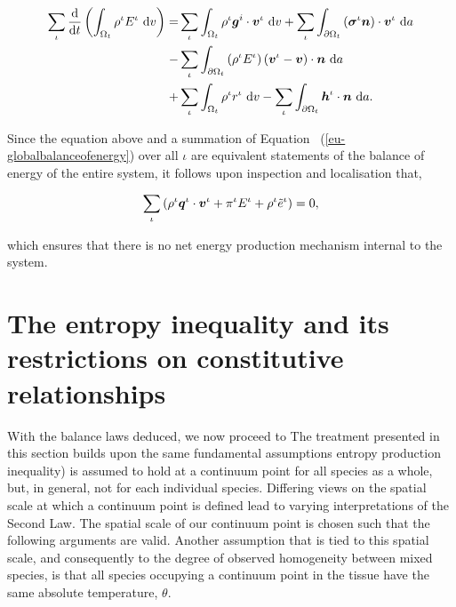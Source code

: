 \begin{equation}
\begin{split}
\sum\limits_{\iota}
\frac{\mathrm{d}}{\mathrm{d}t}\left(\int_{\Omega_{t}} \rho^{\iota}
E^{\iota}\ \mathrm{d}v \right) = & \sum\limits_{\iota}
\int_{\Omega_{t}} \rho^{\iota} \mbox{\boldmath$ g$}^i\cdot\mbox{\boldmath$ v$}^{\iota}\ \mathrm{d}v +
\sum\limits_{\iota} \int_{\partial \Omega_{t}}
\left(\mbox{\boldmath$\sigma$}^{\iota}\mbox{\boldmath$ n$}\right)\cdot\mbox{\boldmath$ v$}^{\iota}\ \mathrm{d}a\\ -&
\sum\limits_{\iota} \int_{\partial \Omega_{t}} \left(\rho^{\iota}
E^{\iota} \right) \left(\mbox{\boldmath$ v$}^{\iota} - \mbox{\boldmath$ v$}\right) \cdot
\mbox{\boldmath$ n$}\ \mathrm{d}a \\ + & \sum\limits_{\iota} \int_{\Omega_{t}}
\rho^{\iota} r^{\iota}\ \mathrm{d}v - \sum\limits_{\iota}
\int_{\partial \Omega_{t}} \mbox{\boldmath$ h$}^{\iota}\cdot\mbox{\boldmath$ n$}\ \mathrm{d}a.
\end{split}
\label{eu-energyexternal}
\end{equation}
 
\noindent Since the equation above and a summation of Equation~%
(\ref{eu-globalbalanceofenergy}) over all $\iota$ are equivalent
statements of the balance of energy of the entire system, it follows
upon inspection and localisation that,

\begin{equation}
 \sum\limits_{\iota} \left( \rho^{\iota}\mbox{\boldmath$ q$}^{\iota}\cdot\mbox{\boldmath$ v$}^{\iota} +
 \pi^{\iota} E^{\iota} + \rho^{\iota}\tilde{e}^{\iota} \right) = 0,
\label{eu-summationrelationenergy}
\end{equation}

\noindent which ensures that there is no net energy production
mechanism internal to the system.

\section{The entropy inequality and its restrictions on constitutive
  relationships}
\label{eu-entropy-inequality}

With the balance laws deduced, we now proceed to 
The treatment presented in this section builds upon the same
fundamental assumptions entropy production inequality) is assumed to hold at a continuum point
for all species as a whole, but, in general, not for each individual
species. Differing views on the spatial scale at which a continuum
point is defined lead to varying interpretations of the Second
Law. The spatial scale of our continuum point is chosen such that the
following arguments are valid. Another assumption that is tied to this
spatial scale, and consequently to the degree of observed homogeneity
between mixed species, is that all species occupying a continuum point
in the tissue have the same absolute temperature, $\theta$.

